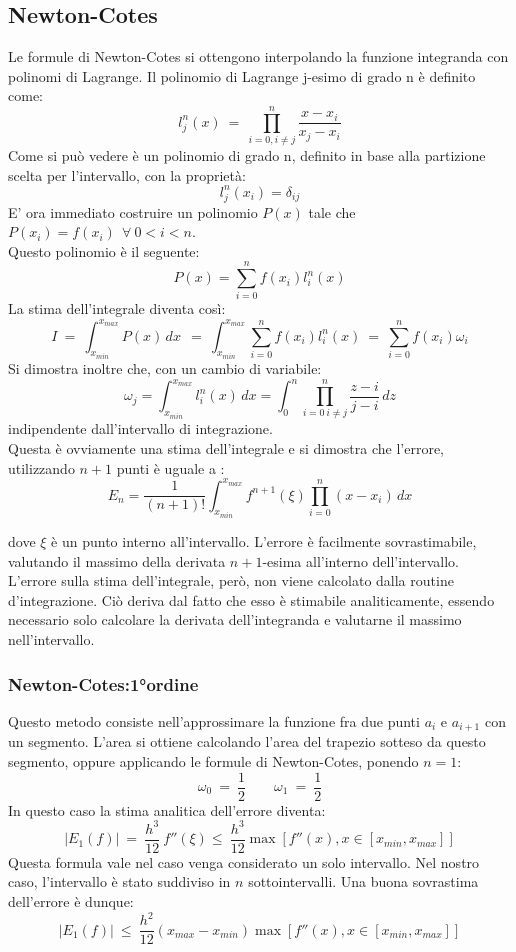 \subsection{Newton-Cotes}
Le formule di Newton-Cotes si ottengono interpolando la funzione integranda con polinomi di Lagrange.
Il polinomio di Lagrange j-esimo di grado n è definito come:
$$
	l_j^n (x)\ = \ \prod_{i = 0, i \ne j}^{n} \frac{x-x_i}{x_j - x_i}
$$
	Come si può vedere è un polinomio di grado n, definito in base alla partizione scelta per l'intervallo, con la proprietà:
$$
	l_j^n ( x_i) = \delta_{ij}
$$
E' ora immediato costruire un polinomio $P(x)$ tale che $ P(x_i) = f(x_i) \ \ \forall \   0<i<n$.\\
Questo polinomio è il seguente:
$$
	P(x) = \sum_{i = 0}^n f(x_i) l_i^n(x)
$$
La stima dell'integrale diventa così:
$$
 I \ = \ \int_{x_{min}}^{x_{max}} P(x) \, dx \ \ = \ \int_{x_{min}}^{x_{max}} \sum_{i = 0}^n f(x_i) l_i^n(x)  \ =  \ \sum_{i = 0}^n f(x_i) \omega_i 
$$
 Si dimostra inoltre che, con un cambio di variabile:
 $$
 \omega_j = \int_{x_{min}}^{x_{max}} l_i^n(x) \,dx  = \int_{0}^{n} \prod_{i = 0 \ i \ne j}^n \frac{z-i}{j-i}\,dz 
$$
indipendente dall'intervallo di integrazione.\\
Questa è ovviamente una stima dell'integrale e si dimostra che l'errore, utilizzando $n+1$ punti è uguale a :
$$
 E_n = \frac{1}{(n+1)!} \int_{x_{min}}^{x_{max}} f^{n+1}(\xi) \prod_{i = 0}^n {(x-x_i)} \, dx 
 $$

 dove $\xi$ è un punto interno all'intervallo. L'errore è facilmente sovrastimabile, valutando il massimo della derivata $n+1$-esima all'interno dell'intervallo. L'errore sulla stima dell'integrale,
però, non viene calcolato dalla routine d'integrazione. Ciò deriva dal fatto che esso è stimabile analiticamente,
essendo necessario solo calcolare la derivata dell'integranda e valutarne il massimo nell'intervallo.

\subsubsection*{Newton-Cotes:1°ordine}
Questo metodo consiste nell'approssimare la funzione fra due punti $a_i$ e $a_{i+1}$ con un segmento.
L'area si ottiene calcolando l'area del trapezio sotteso da questo segmento, oppure applicando le formule di Newton-Cotes, ponendo $ n = 1$: 
$$
\omega_0 \ = \ \frac{1}{2} \qquad \omega_1 \ = \ \frac{1}{2}
$$
In questo caso la stima analitica dell'errore diventa:
$$
| E_1(f) |  \ = \ \frac{h^3}{12} \ f''(\xi) \leq \  \frac{h^3}{12} \max \left[ f''(x), x \in [x_{min},x_{max}] \right]
$$
Questa formula vale nel caso venga considerato un solo intervallo. Nel nostro caso, l'intervallo è stato suddiviso in $n$ sottointervalli. Una buona sovrastima dell'errore è dunque:
$$
| E_1(f) |  \ \leq \ \frac{h^2}{12}\left( x_{max} - x_{min} \right) \max \left[ f''(x), x \in [x_{min},x_{max}] \right]
$$
